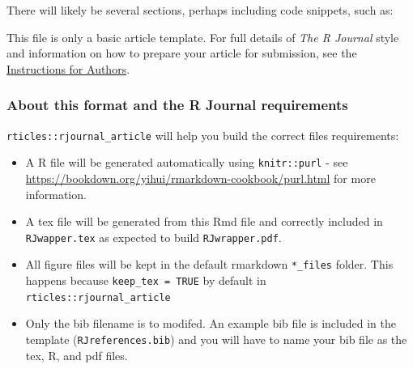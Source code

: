 

There will likely be several sections, perhaps including code snippets,
such as:

%
%

This file is only a basic article template. For full details of
\emph{The R Journal} style and information on how to prepare your
article for submission, see the
\href{https://journal.r-project.org/share/author-guide.pdf}{Instructions
for Authors}.

\hypertarget{about-this-format-and-the-r-journal-requirements}{%
\subsubsection{About this format and the R Journal
requirements}\label{about-this-format-and-the-r-journal-requirements}}

\texttt{rticles::rjournal\_article} will help you build the correct
files requirements:

\begin{itemize}
\tightlist
\item
  A R file will be generated automatically using \texttt{knitr::purl} -
  see \url{https://bookdown.org/yihui/rmarkdown-cookbook/purl.html} for
  more information.
\item
  A tex file will be generated from this Rmd file and correctly included
  in \texttt{RJwapper.tex} as expected to build \texttt{RJwrapper.pdf}.
\item
  All figure files will be kept in the default rmarkdown
  \texttt{*\_files} folder. This happens because
  \texttt{keep\_tex\ =\ TRUE} by default in
  \texttt{rticles::rjournal\_article}
\item
  Only the bib filename is to modifed. An example bib file is included
  in the template (\texttt{RJreferences.bib}) and you will have to name
  your bib file as the tex, R, and pdf files.
\end{itemize}



\address{%
Paavo Jumppanen\\
CSIRO Marine and Atmospheric Research\\%
Castray Esplanade,\\Battery Point TAS 7004,\\Australia\\
%
\url{https://www.csiro.au}%
\\\href{mailto:paavo.jumppanen@csiro.au}{\nolinkurl{paavo.jumppanen@csiro.au}}
}
